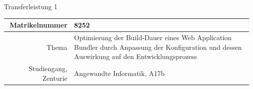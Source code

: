 \documentclass[11pt]{article}
\begin{document}
    {\huge Transferleistung 1}
    \vspace{1cm}

    \begin{center}
        \begin{tabularx}{\textwidth}{r|X}
            Matrikelnummer & 8252 \\\midrule
            Thema & Optimierung der Build-Dauer eines Web Application Bundler durch Anpassung der Konfiguration und dessen Auswirkung auf den Entwicklungsprozess \\\midrule %
            Studiengang, Zenturie & Angewandte Informatik, A17b\
        \end{tabularx}
    \end{center}
    \pagebreak

    \tableofcontents
    \listoffigures
    \listoftables
    \pagebreak
    
\end{document}
